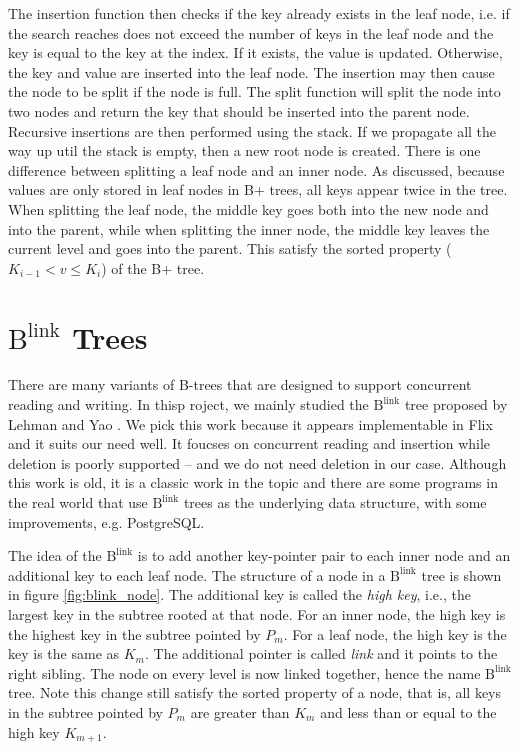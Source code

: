 \documentclass[twoside,11pt]{report}
\theoremstyle{definition}
\begin{document}
The insertion function then checks if the key already exists in the leaf node, i.e. if the search reaches does not exceed the number of keys in the leaf node and the key is equal to the key at the index. If it exists, the value is updated. Otherwise, the key and value are inserted into the leaf node. The insertion may then cause the node to be split if the node is full. The split function will split the node into two nodes and return the key that should be inserted into the parent node. Recursive insertions are then performed using the stack. If we propagate all the way up util the stack is empty, then a new root node is created. There is one difference between splitting a leaf node and an inner node. As discussed, because values are only stored in leaf nodes in B+ trees, all keys appear twice in the tree. When splitting the leaf node, the middle key goes both into the new node and into the parent, while when splitting the inner node, the middle key leaves the current level and goes into the parent. This satisfy the sorted property ($K_{i-1} < v \leq K_i$) of the B+ tree.

\section{$\text{B}^{\text{link}}$ Trees}

There are many variants of B-trees that are designed to support concurrent reading and writing. In thisp roject, we mainly studied the $\text{B}^{\text{link}}$ tree proposed by Lehman and Yao \cite{10.1145/319628.319663}. We pick this work because it appears implementable in Flix and it suits our need well. It foucses on concurrent reading and insertion while deletion is poorly supported -- and we do not need deletion in our case. Although this work is old, it is a classic work in the topic and there are some programs in the real world that use $\text{B}^{\text{link}}$ trees as the underlying data structure, with some improvements, e.g. PostgreSQL.

The idea of the $\text{B}^{\text{link}}$ is to add another key-pointer pair to each inner node and an additional key to each leaf node. The structure of a node in a $\text{B}^{\text{link}}$ tree is shown in figure \ref{fig:blink_node}. The additional key is called the \textit{high key}, i.e., the largest key in the subtree rooted at that node. For an inner node, the high key is the highest key in the subtree pointed by $P_m$. For a leaf node, the high key is the key is the same as $K_m$. The additional pointer is called \textit{link} and it points to the right sibling. The node on every level is now linked together, hence the name $\text{B}^{\text{link}}$ tree. Note this change still satisfy the sorted property of a node, that is, all keys in the subtree pointed by $P_m$ are greater than $K_m$ and less than or equal to the high key $K_{m+1}$.
\end{document}
